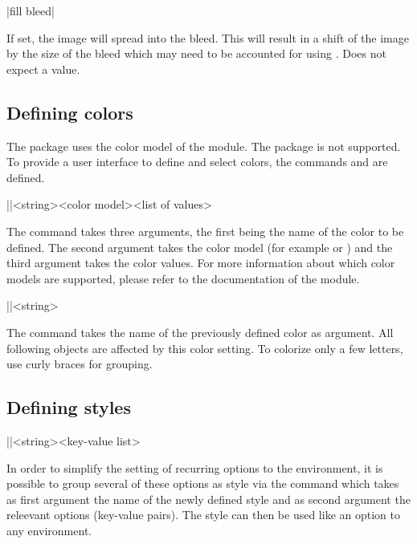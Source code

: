 \documentclass[a4paper]{article}
\begin{document}
\begin{macrodef}
|fill bleed|
\end{macrodef}
If set, the image will spread into the bleed. This will result in a shift of the image by the size of the bleed which may need to be accounted for using . Does not expect a value.

\subsection{Defining colors}

The package uses the color model of the  module. The  package is not supported. To provide a user interface to define and select colors, the commands \macro{\leporellocolordefine} and \macro{\leporellocolorselect} are defined. 

\begin{macrodef}
|\leporellocolordefine|{<string>}{<color model>}{<list of values>}
\end{macrodef}
The command \macro{\leporellocolordefine} takes three arguments, the first being the name of the color to be defined. The second argument takes the color model (for example  or ) and the third argument takes the color values. For more information about which color models are supported, please refer to the documentation of the  module.

\begin{macrodef}
|\leporellocolorselect|{<string>}
\end{macrodef}
The command \macro{\leporellocolorselect} takes the name of the previously defined color as argument. All following objects are affected by this color setting. To colorize only a few letters, use curly braces for grouping.

\subsection{Defining styles}

\begin{macrodef}
|\leporellosetstyle|{<string>}{<key-value list>}
\end{macrodef}
In order to simplify the setting of recurring options to the  environment, it is possible to group several of these options as style via the \macro{\leporellosetstyle} command which takes as first argument the name of the newly defined style and as second argument the releevant options (key-value pairs). The style can then be used like an option to any  environment.
\end{document}
